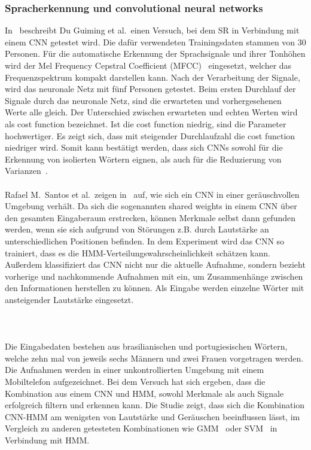\subsubsection{Spracherkennung und convolutional neural networks}
In~\cite{usingcnn} beschreibt Du Guiming et al.~einen Versuch, bei dem SR in Verbindung mit einem CNN getestet wird. Die dafür verwendeten Trainingsdaten stammen von 30 Personen. Für die automatische Erkennung der Sprachsignale und ihrer Tonhöhen wird der Mel Frequency Cepstral Coefficient (MFCC)~\cite{MFCC} eingesetzt, welcher das Frequenzspektrum kompakt darstellen kann. Nach der Verarbeitung der Signale, wird das neuronale Netz mit fünf Personen getestet. Beim ersten Durchlauf der Signale durch das neuronale Netz, sind die erwarteten und vorhergesehenen Werte alle gleich. Der Unterschied zwischen erwarteten und echten Werten wird als cost function bezeichnet. Ist die cost function niedrig, sind die Parameter hochwertiger. Es zeigt sich, dass mit steigender Durchlaufzahl die cost function niedriger wird. Somit kann bestätigt werden, dass sich CNNs sowohl für die Erkennung von isolierten Wörtern eignen, als auch für die Reduzierung von Varianzen~\cite{usingcnn}.\\
\\
Rafael M.~Santos et al.~zeigen in~\cite{noisycnn} auf, wie sich ein CNN in einer geräuschvol\-len Umgebung verhält. Da sich die sogenannten shared weights in einem CNN über den gesamten Eingaberaum erstrecken, können Merkmale selbst dann gefunden werden, wenn sie sich aufgrund von Störungen z.B. durch Lautstärke an unterschiedlichen Positionen befinden. In dem Experiment wird das CNN so trainiert, dass es die HMM-Verteilungswahrscheinlich\-keit schätzen kann. Außerdem klassifiziert das CNN nicht nur die aktuelle Aufnahme, sondern bezieht vorherige und nachkommende Aufnahmen mit ein, um Zusammenhän\-ge zwischen den Informationen herstellen zu können. Als Eingabe werden einzel\-ne Wörter mit ansteigender Lautstärke eingesetzt.
\\
\\
\\
\\
Die Eingabedaten bestehen aus brasilianischen und portugiesischen Wörtern, welche zehn mal von jeweils sechs Männern und zwei Frauen vorgetragen werden. Die Aufnahmen werden in einer unkontrollierten Umgebung mit einem Mobiltelefon aufgezeichnet. Bei dem Versuch hat sich ergeben, dass die Kombination aus einem CNN und HMM, sowohl Merkmale als auch Signale erfolgreich filtern und erkennen kann. Die Studie zeigt, dass sich die Kombination CNN-HMM am wenigsten von Lautstärke und Geräuschen beeinflussen lässt, im Vergleich zu anderen getesteten Kombinationen wie GMM~\cite{svmgmm} oder SVM~\cite{svmgmm} in Verbindung mit HMM.

